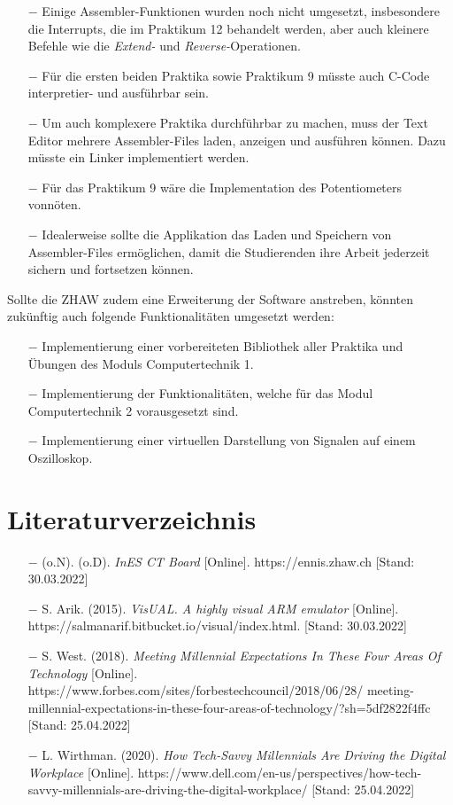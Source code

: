\documentclass[10pt]{article}
\begin{document}
\begin{itemize}
	\item[$-$] Einige Assembler-Funktionen wurden noch nicht umgesetzt, insbesondere die Interrupts, die im Praktikum 12 behandelt werden, aber auch kleinere Befehle wie die \emph{Extend-} und \emph{Reverse-}Operationen.
	\item[$-$] Für die ersten beiden Praktika sowie Praktikum 9 müsste auch C-Code interpretier- und ausführbar sein.
	\item[$-$] Um auch komplexere Praktika durchführbar zu machen, muss der Text Editor mehrere Assembler-Files laden, anzeigen und ausführen können. Dazu müsste ein Linker implementiert werden.
	\item[$-$] Für das Praktikum 9 wäre die Implementation des Potentiometers vonnöten.
	\item[$-$] Idealerweise sollte die Applikation das Laden und Speichern von Assembler-Files ermöglichen, damit die Studierenden ihre Arbeit jederzeit sichern und fortsetzen können.


\end{itemize}


Sollte die ZHAW zudem eine Erweiterung der Software anstreben, könnten zukünftig auch folgende Funktionalitäten umgesetzt werden: 
\begin{itemize}
\item[$-$] Implementierung einer vorbereiteten Bibliothek aller Praktika und Übungen des Moduls \glqq Computertechnik 1\grqq. 
\item[$-$] Implementierung der Funktionalitäten, welche für das Modul \glqq Computertechnik 2\grqq{} vorausgesetzt sind. 
\item[$-$] Implementierung einer virtuellen Darstellung von Signalen auf einem Oszilloskop.
\end{itemize}

\newpage
\section{Literaturverzeichnis}

\begin{itemize}

\item[$-$] (o.N). (o.D). \emph{InES CT Board} [Online]. https://ennis.zhaw.ch [Stand: 30.03.2022]
\item[$-$] S. Arik. (2015). \emph{VisUAL. A highly visual ARM emulator} [Online]. https://salmanarif.bitbucket.io/visual/index.html. [Stand: 30.03.2022]
\item[$-$] S. West. (2018). \emph{Meeting Millennial Expectations In These Four Areas Of Technology} [Online]. https://www.forbes.com/sites/forbestechcouncil/2018/06/28/ meeting-millennial-expectations-in-these-four-areas-of-technology/?sh=5df2822f4ffc [Stand: 25.04.2022]
\item[$-$] L. Wirthman. (2020). \emph{How Tech-Savvy Millennials Are Driving the Digital Workplace} [Online]. https://www.dell.com/en-us/perspectives/how-tech-savvy-millennials-are-driving-the-digital-workplace/ [Stand: 25.04.2022]

\end{itemize}
\end{document}
